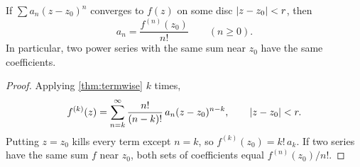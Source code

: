 \begin{theorem}\label{thm:uniqueness}
  If $\sum a_n (z - z_0)^n$ converges to $f(z)$ on some disc
  $\lvert z - z_0\rvert < r$, then
  \[
    a_n = \frac{f^{(n)}(z_0)}{n!} \qquad (n \geq 0).
  \]
  In particular, two power series with the same sum near $z_0$ have the same
  coefficients.
\end{theorem}

\begin{proof}
  Applying \cref{thm:termwise} $k$ times,
  \[
    f^{(k)}(z) = \sum_{n=k}^{\infty} \frac{n!}{(n-k)!} \, a_n (z - z_0)^{n-k},
    \qquad \lvert z - z_0\rvert < r.
  \]
  Putting $z = z_0$ kills every term except $n = k$, so $f^{(k)}(z_0) = k! \, a_k$.
  If two series have the same sum $f$ near $z_0$, both sets of coefficients
  equal $f^{(n)}(z_0)/n!$.
\end{proof}
